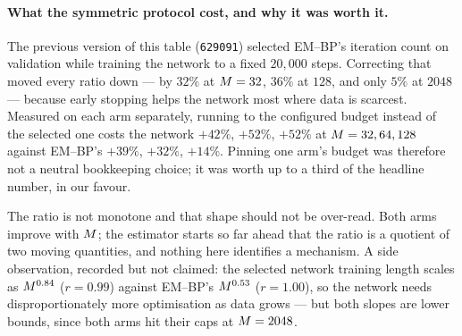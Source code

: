 \paragraph{What the symmetric protocol cost, and why it was worth it.}
The previous version of this table (\texttt{629091}) selected EM--BP's iteration count on
validation while training the network to a fixed $20{,}000$ steps. Correcting that moved every
ratio down --- by $32\%$ at $M=32$, $36\%$ at $128$, and only $5\%$ at $2048$ --- because early
stopping helps the network most where data is scarcest. Measured on each arm separately, running to
the configured budget instead of the selected one costs the network $+42\%$, $+52\%$, $+52\%$ at
$M=32,64,128$ against EM--BP's $+39\%$, $+32\%$, $+14\%$. Pinning one arm's budget was
therefore not a neutral bookkeeping choice; it was worth up to a third of the headline number, in
our favour.

The ratio is not monotone and that shape should not be over-read. Both arms improve with $M$;
the estimator starts so far ahead that the ratio is a quotient of two moving quantities, and
nothing here identifies a mechanism. A side observation, recorded but not claimed: the selected
network training length scales as $M^{0.84}$ ($r=0.99$) against EM--BP's $M^{0.53}$
($r=1.00$), so the network needs disproportionately more optimisation as data grows --- but both
slopes are lower bounds, since both arms hit their caps at $M=2048$.

